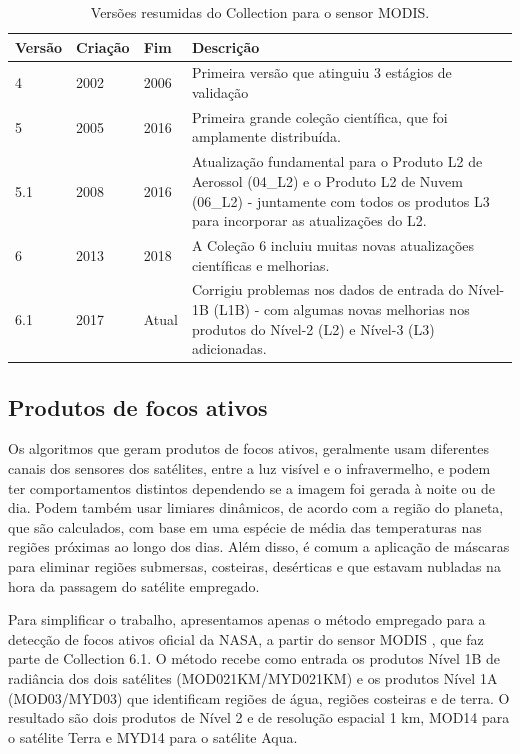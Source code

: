 \documentclass[cic,tc]{iiufrgs}
\begin{document}
\begin{table}[htbp]
\centering
\caption{Versões resumidas do Collection para o sensor MODIS.}
\begin{tabular}{ @{}lllp{10cm}@{} }
  \toprule
  \textbf{Versão} & \textbf{Criação} & \textbf{Fim} & \textbf{Descrição} \\
  \midrule
  4   & 2002 & 2006  & Primeira versão que atinguiu 3 estágios de validação \\
  5   & 2005 & 2016  & Primeira grande coleção científica, que foi amplamente distribuída. \\
  5.1 & 2008 & 2016  & Atualização fundamental para o Produto L2 de Aerossol (04\_L2) e o Produto L2 de Nuvem (06\_L2) - juntamente com todos os produtos L3 para incorporar as atualizações do L2. \\
  6   & 2013 & 2018  & A Coleção 6 incluiu muitas novas atualizações científicas e melhorias. \\
  6.1 & 2017 & Atual & Corrigiu problemas nos dados de entrada do Nível-1B (L1B) - com algumas novas melhorias nos produtos do Nível-2 (L2) e Nível-3 (L3) adicionadas. \\
  \bottomrule
\end{tabular}
\label{table:versoes_collection}
\end{table}

\subsection*{Produtos de focos ativos}

Os algoritmos que geram produtos de focos ativos, geralmente usam diferentes canais dos sensores dos satélites, entre a luz visível e o infravermelho, e podem ter comportamentos distintos dependendo se a imagem foi gerada à noite ou de dia. Podem também usar limiares dinâmicos, de acordo com a região do planeta, que são calculados, com base em uma espécie de média das temperaturas nas regiões próximas ao longo dos dias. Além disso, é comum a aplicação de máscaras para eliminar regiões submersas, costeiras, desérticas e que estavam nubladas na hora da passagem do satélite empregado.

Para simplificar o trabalho, apresentamos apenas o método empregado para a detecção de focos ativos oficial da NASA, a partir do sensor MODIS \citep{GIGLIO2016}, que faz parte de Collection 6.1. O método recebe como entrada os produtos Nível 1B de radiância dos dois satélites (MOD021KM/MYD021KM) e os produtos Nível 1A (MOD03/MYD03) que identificam regiões de água, regiões costeiras e de terra. O resultado são dois produtos de Nível 2 e de resolução espacial 1 km, MOD14 para o satélite Terra e MYD14 para o satélite Aqua.
\end{document}
